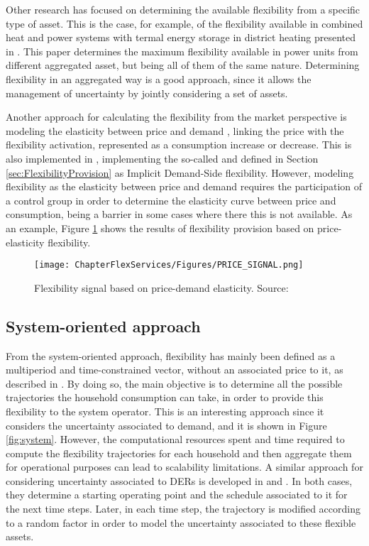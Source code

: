 Other research has focused on determining the available flexibility from a specific type of asset. This is the case, for example, of the flexibility available in combined heat and power systems with termal energy storage in district heating presented in \cite{nuytten2013flexibility}. This paper determines the maximum flexibility available in power units from different aggregated asset, but being all of them of the same nature. Determining flexibility in an aggregated way is a good approach, since it allows the management of uncertainty by jointly considering a set of assets.  

Another approach for calculating the flexibility from the market perspective is modeling the elasticity between price and demand \cite{Gorria2013}, linking the price with the flexibility activation, represented as a consumption increase or decrease. This is also implemented in \cite{Moret2016}, implementing the so-called and defined in Section \ref{sec:FlexibilityProvision} as Implicit Demand-Side flexibility. However, modeling flexibility as the elasticity between price and demand requires the participation of a control group in order to determine the elasticity curve between price and consumption, being a barrier in some cases where there this is not available. As an example, Figure \ref{fig:elasticity} shows the results of flexibility provision based on price-elasticity flexibility. 

\begin{figure}[htbp]
	\centering
	\texttt{[image: ChapterFlexServices/Figures/PRICE\_SIGNAL.png]}
		\caption{Flexibility signal based on price-demand elasticity. Source: \cite{Gorria2013}}
	\label{fig:elasticity}  
\end{figure}


\subsection{System-oriented approach}
From the system-oriented approach, flexibility has mainly been defined as a multiperiod and time-constrained vector, without an associated price to it, as described in \cite{Pinto2017}. By doing so, the main objective is to determine all the possible trajectories the household consumption can take, in order to provide this flexibility to the system operator. This is an interesting approach since it considers the uncertainty associated to demand, and it is shown in Figure \ref{fig:system}. However, the computational resources spent and time required to compute the flexibility trajectories for each household and then aggregate them for operational purposes can lead to scalability limitations. A similar approach for considering uncertainty associated to DERs is developed in \cite{Bremer2013} and \cite{SONNENSCHEIN2015}. In both cases, they determine a starting operating point and the schedule associated to it for the next time steps. Later, in each time step, the trajectory is modified according to a random factor in order to model the uncertainty associated to these flexible assets. 

